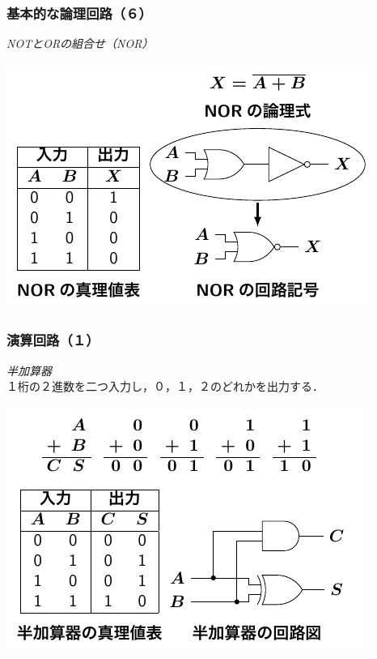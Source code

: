 \documentclass{beamer}                 %
\begin{document}
\begin{frame}
  \frametitle{基本的な論理回路（６）}
  \emph{NOTとORの組合せ（NOR）} \\
  \vfill
  \centerline{\includegraphics[scale=1.3]{../Tikz/nor.pdf}}
  \vfill
\end{frame}

\begin{frame}
  \frametitle{演算回路（１）}
  \emph{半加算器} \\
  １桁の２進数を二つ入力し，０，１，２のどれかを出力する．
  \vfill
  \centerline{\includegraphics[scale=1.3]{../Tikz/ha.pdf}}
  \vfill
\end{frame}
\end{document}
